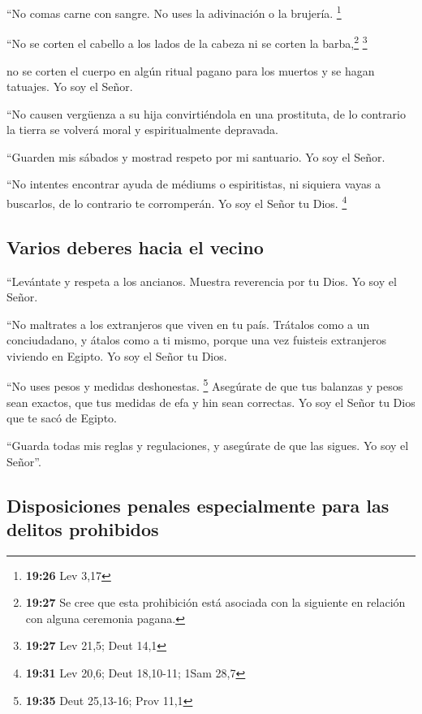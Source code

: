  ``No comas carne con sangre. No uses la adivinación o la
brujería. \footnote{\textbf{19:26} Lev 3,17}

 ``No se corten el cabello a los lados de la cabeza ni se
corten la barba,\footnote{\textbf{19:27} Se cree que esta prohibición
  está asociada con la siguiente en relación con alguna ceremonia
  pagana.} \footnote{\textbf{19:27} Lev 21,5; Deut 14,1}

 no se corten el cuerpo en algún ritual pagano para los
muertos y se hagan tatuajes. Yo soy el Señor.

 ``No causen vergüenza a su hija convirtiéndola en una
prostituta, de lo contrario la tierra se volverá moral y espiritualmente
depravada.

 ``Guarden mis sábados y mostrad respeto por mi
santuario. Yo soy el Señor.

 ``No intentes encontrar ayuda de médiums o espiritistas,
ni siquiera vayas a buscarlos, de lo contrario te corromperán. Yo soy el
Señor tu Dios. \footnote{\textbf{19:31} Lev 20,6; Deut 18,10-11; 1Sam
  28,7}

\hypertarget{varios-deberes-hacia-el-vecino}{%
\subsection{Varios deberes hacia el
vecino}\label{varios-deberes-hacia-el-vecino}}

 ``Levántate y respeta a los ancianos. Muestra reverencia
por tu Dios. Yo soy el Señor.

 ``No maltrates a los extranjeros que viven en tu país.
 Trátalos como a un conciudadano, y átalos como a ti
mismo, porque una vez fuisteis extranjeros viviendo en Egipto. Yo soy el
Señor tu Dios.

 ``No uses pesos y medidas deshonestas. \footnote{\textbf{19:35}
  Deut 25,13-16; Prov 11,1}  Asegúrate de que tus
balanzas y pesos sean exactos, que tus medidas de efa y hin sean
correctas. Yo soy el Señor tu Dios que te sacó de Egipto.

 ``Guarda todas mis reglas y regulaciones, y asegúrate de
que las sigues. Yo soy el Señor''.

\hypertarget{disposiciones-penales-especialmente-para-las-delitos-prohibidos}{%
\subsection{Disposiciones penales especialmente para las delitos
prohibidos}\label{disposiciones-penales-especialmente-para-las-delitos-prohibidos}}

